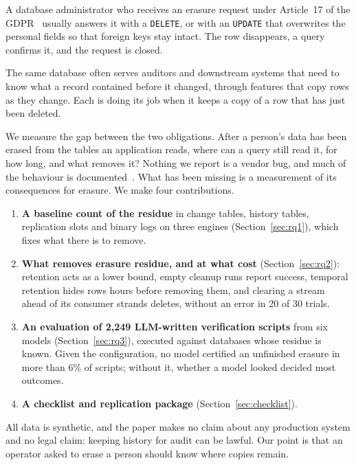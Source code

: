 \documentclass[runningheads]{llncs}
\begin{document}
A database administrator who receives an erasure request under Article~17 of
the GDPR~\cite{gdpr} usually answers it with a \texttt{DELETE}, or with an
\texttt{UPDATE} that overwrites the personal fields so that foreign keys stay
intact. The row disappears, a query confirms it, and the request is closed.

The same database often serves auditors and downstream systems that need to
know what a record contained before it changed, through features that copy
rows as they change. Each is doing its job when it keeps a copy of a row that
has just been deleted.

We measure the gap between the two obligations. After a person's data has been
erased from the tables an application reads, where can a query still read it,
for how long, and what removes it? Nothing we report is a vendor bug, and much
of the behaviour is documented~\cite{mscdc,mstemporal,pgconfig}. What has been
missing is a measurement of its consequences for erasure. We make four
contributions.

\begin{enumerate}
\item \textbf{A baseline count of the residue} in change tables, history
tables, replication slots and binary logs on three engines
(Section~\ref{sec:rq1}), which fixes what there is to remove.
\item \textbf{What removes erasure residue, and at what cost}
(Section~\ref{sec:rq2}): retention acts as a lower bound, empty cleanup runs
report success, temporal retention hides rows hours before removing them, and
clearing a stream ahead of its consumer strands deletes, without an error in 20
of 30 trials.
\item \textbf{An evaluation of 2,249 LLM-written verification scripts} from
six models (Section~\ref{sec:rq3}), executed against databases whose residue is
known. Given the configuration, no model certified an unfinished erasure in
more than 6\% of scripts; without it, whether a model looked decided most
outcomes.
\item \textbf{A checklist and replication package} (Section~\ref{sec:checklist}).
\end{enumerate}

All data is synthetic, and the paper makes no claim about any production system
and no legal claim: keeping history for audit can be lawful. Our point is that
an operator asked to erase a person should know where copies remain.

\end{document}
